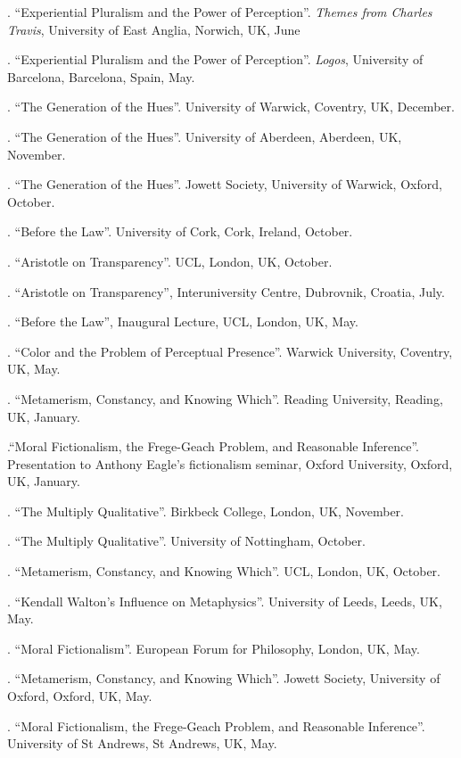 \documentclass[11pt]{article}
\begin{document}
. ``Experiential Pluralism and the Power of Perception''. \emph{Themes from Charles Travis}, University of East Anglia, Norwich, UK, June

. ``Experiential Pluralism and the Power of Perception''. \emph{Logos}, University of Barcelona, Barcelona, Spain, May.

. ``The Generation of the Hues''. University of Warwick, Coventry, UK, December.

. ``The Generation of the Hues''. University of Aberdeen, Aberdeen, UK, November.

. ``The Generation of the Hues''. Jowett Society, University of Warwick, Oxford, October.

. ``Before the Law''. University of Cork, Cork, Ireland, October.

. ``Aristotle on Transparency''. UCL, London, UK, October.

. ``Aristotle on Transparency'', Interuniversity Centre, Dubrovnik, Croatia, July.

. ``Before the Law'', Inaugural Lecture, UCL, London, UK, May.

.  ``Color and the Problem of Perceptual Presence''. Warwick University, Coventry, UK, May.

. ``Metamerism, Constancy, and Knowing Which''. Reading University, Reading, UK, January.

.``Moral Fictionalism, the Frege-Geach Problem, and Reasonable Inference''. Presentation to Anthony Eagle's fictionalism seminar, Oxford University, Oxford, UK, January.

. ``The Multiply Qualitative''. Birkbeck College, London, UK, November.

. ``The Multiply Qualitative''. University of Nottingham, October.

. ``Metamerism, Constancy, and Knowing Which''. UCL, London, UK, October.

. ``Kendall Walton's Influence on Metaphysics''. University of Leeds, Leeds, UK, May.

. ``Moral Fictionalism''. European Forum for Philosophy, London, UK, May.

. ``Metamerism, Constancy, and Knowing Which''. Jowett Society, University of Oxford, Oxford, UK, May.

. ``Moral Fictionalism, the Frege-Geach Problem, and Reasonable Inference''. University of St Andrews, St Andrews, UK, May.
\end{document}
